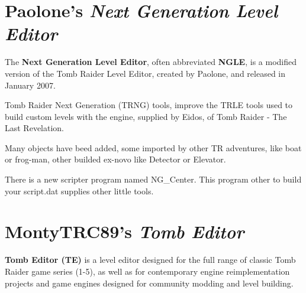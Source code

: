 \section{Paolone's \emph{Next Generation Level Editor}  }
The \textbf{Next Generation Level Editor}, often abbreviated \textbf{NGLE}, is a modified version of the Tomb Raider Level Editor, created by Paolone, and released in January 2007. \cite{wikiraider_NGLE}
\par Tomb Raider Next Generation  (TRNG)  tools, improve the TRLE tools used to build custom levels with the engine, supplied by Eidos, of Tomb Raider - The Last Revelation.
\par Many objects have beed added, some imported by other TR adventures, like boat or frog-man, other builded ex-novo like Detector or Elevator.
\par There is a new scripter program named NG\_Center. This program other to build your script.dat supplies other little tools. \cite{paolone_trng}
\section{MontyTRC89's \emph{Tomb Editor}}
\textbf{Tomb Editor (TE)} is a level editor designed for the full range of classic Tomb Raider game series (1-5), as well as for contemporary engine reimplementation projects and game engines designed for community modding and level building. \cite{TE_github}